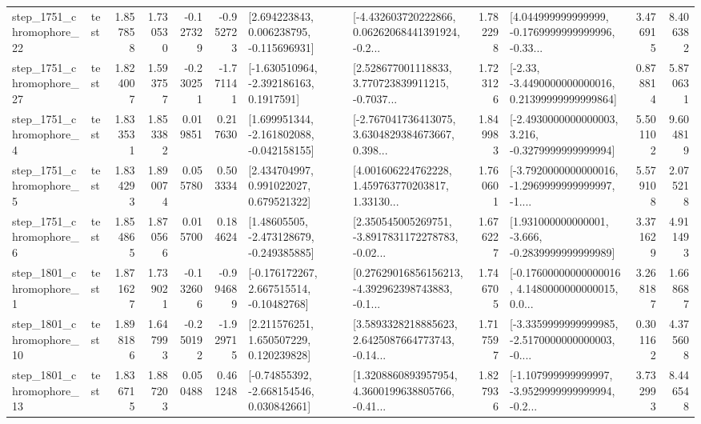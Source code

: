 \begin{tabular}{llrrrrllrlrr}
 step\_1751\_chromophore\_22 &      test &      1.857858 &    1.730530 &     -0.127329 & -0.952723 &    [2.694223843, 0.006238795, -0.115696931] &  [-4.432603720222866, 0.06262068441391924, -0.2... &       1.782298 &  [4.044999999999999, -0.1769999999999996, -0.33... &            3.476915 &          8.406382 \\
 step\_1751\_chromophore\_27 &      test &      1.824007 &    1.593757 &     -0.230251 & -1.771141 &     [-1.630510964, -2.392186163, 0.1917591] &  [2.528677001118833, 3.770723839911215, -0.7037... &       1.723126 &  [-2.33, -3.4490000000000016, 0.21399999999999864] &            0.878814 &          5.870631 \\
  step\_1751\_chromophore\_4 &      test &      1.833531 &    1.853382 &      0.019851 &  0.217630 &   [1.699951344, -2.161802088, -0.042158155] &  [-2.767041736413075, 3.6304829384673667, 0.398... &       1.849983 &  [-2.4930000000000003, 3.216, -0.3279999999999994] &            5.501102 &          9.604819 \\
  step\_1751\_chromophore\_5 &      test &      1.834293 &    1.890074 &      0.055780 &  0.503334 &     [2.434704997, 0.991022027, 0.679521322] &  [4.001606224762228, 1.459763770203817, 1.33130... &       1.760601 &  [-3.7920000000000016, -1.2969999999999997, -1.... &            5.579108 &          2.075218 \\
  step\_1751\_chromophore\_6 &      test &      1.854865 &    1.870566 &      0.015700 &  0.184624 &    [1.48605505, -2.473128679, -0.249385885] &  [2.350545005269751, -3.8917831172278783, -0.02... &       1.676227 &   [1.931000000000001, -3.666, -0.2839999999999989] &            3.371629 &          4.911493 \\
  step\_1801\_chromophore\_1 &      test &      1.871627 &    1.739021 &     -0.132606 & -0.994689 &    [-0.176172267, 2.667515514, -0.10482768] &  [0.27629016856156213, -4.392962398743883, -0.1... &       1.746705 &  [-0.17600000000000016, 4.1480000000000015, 0.0... &            3.268187 &          1.668687 \\
 step\_1801\_chromophore\_10 &      test &      1.898186 &    1.647993 &     -0.250192 & -1.929715 &     [2.211576251, 1.650507229, 0.120239828] &  [3.5893328218885623, 2.6425087664773743, -0.14... &       1.717597 &  [-3.3359999999999985, -2.5170000000000003, -0.... &            0.301162 &          4.375608 \\
 step\_1801\_chromophore\_13 &      test &      1.836715 &    1.887203 &      0.050488 &  0.461248 &    [-0.74855392, -2.668154546, 0.030842661] &  [1.3208860893957954, 4.3600199638805766, -0.41... &       1.827936 &  [-1.107999999999997, -3.9529999999999994, -0.2... &            3.732993 &          8.446548 \\

\end{tabular}
